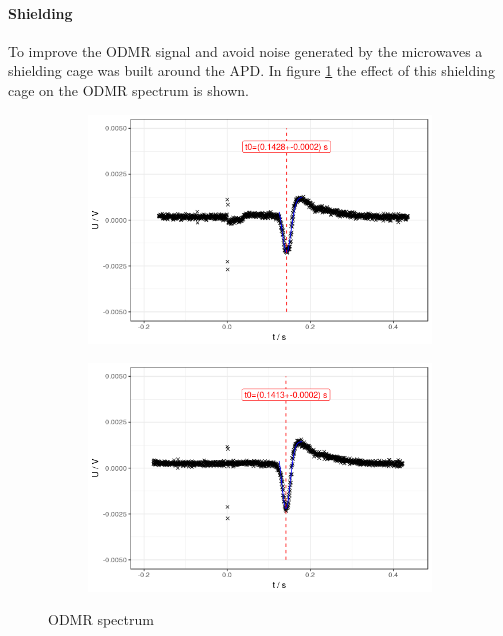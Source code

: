 \paragraph{Shielding}
To improve the ODMR signal and avoid noise generated by the microwaves a shielding cage was built around the APD. In figure \ref{fig:odmr-shield} the effect of this shielding cage on the ODMR spectrum is shown.
\begin{figure}
	\begin{subfigure}{0.5\textwidth}
		\includegraphics[width=\textwidth]{../figures/odmr-cal-1.png}
	\end{subfigure}
		\begin{subfigure}{0.5\textwidth}	\includegraphics[width=\textwidth]{../figures/odmr-cal-2.png}
	\end{subfigure}
	\caption{ODMR spectrum}
	\label{fig:odmr-shield}
\end{figure}
